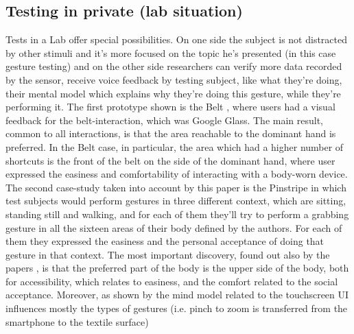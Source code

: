 \documentclass{sigchi}
\begin{document}
\subsection{Testing in private (lab situation)}
Tests in a Lab offer special possibilities. On one side the subject is not distracted by other stimuli and it’s more focused on the topic he’s presented (in this case gesture testing) and on the other side researchers can verify more data recorded by the sensor, receive voice feedback by testing subject, like what they’re doing, their mental model which explains why they’re doing this gesture, while they’re performing it.
The first prototype shown is the Belt \cite{belt}, where users had a visual feedback for the belt-interaction, which was Google Glass. The main result, common to all interactions, is that the area reachable to the dominant hand is preferred. In the Belt case, in particular, the area which had a higher number of shortcuts is the front of the belt on the side of the dominant hand, where user expressed the easiness and comfortability of interacting with a body-worn device. The second case-study taken into account by this paper is the Pinstripe \cite{pinstripe} in which test subjects would perform gestures in three different context, which are sitting, standing still and walking, and  for each of them they’ll try to perform a grabbing gesture in all the sixteen areas of their body defined by the authors. For each of them they expressed the easiness and the personal acceptance of doing that gesture in that context. The most important discovery, found out also by the  papers \cite{social-comfort, belt}, is that the preferred part of the body is the upper side of the body, both for accessibility, which relates to easiness, and the comfort related to the social acceptance.
Moreover, as shown by \cite{more-touch} the mind model related to the touchscreen UI influences mostly the types of gestures (i.e. pinch to zoom is transferred from the smartphone to the textile surface)
\end{document}
